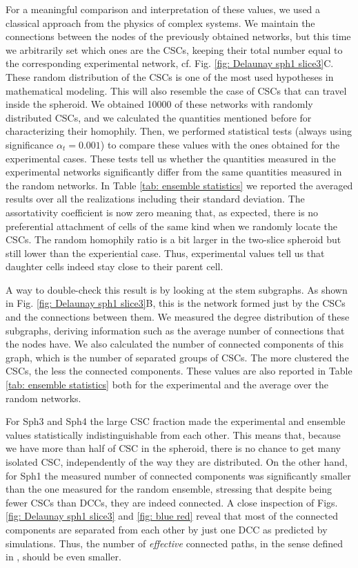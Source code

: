 \documentclass[fleqn,10pt]{wlscirep}
\begin{document}
For a meaningful comparison and interpretation of these values, we used a classical approach from the physics of complex systems. We maintain the connections between the nodes of the previously obtained networks, but this time we arbitrarily set which ones are the CSCs, keeping their total number equal to the corresponding experimental network, cf. Fig. \ref{fig: Delaunay sph1 slice3}C. These random distribution of the CSCs is one of the most used hypotheses in mathematical modeling. This will also resemble the case of CSCs that can travel inside the spheroid. We obtained 10000 of these networks with randomly distributed CSCs, and we calculated the quantities mentioned before for characterizing their homophily. Then, we performed statistical tests (always using significance $\alpha_t=0.001$) to compare these values with the ones obtained for the experimental cases. These tests tell us whether the quantities measured in the experimental networks significantly differ from the same quantities measured in the random networks. In Table \ref{tab: ensemble statistics} we reported the averaged results over all the realizations including their standard deviation. The assortativity coefficient is now zero meaning that, as expected, there is no preferential attachment of cells of the same kind when we randomly locate the CSCs. The random homophily ratio is a bit larger in the two-slice spheroid but still lower than the experiential case. Thus, experimental values tell us that daughter cells indeed stay close to their parent cell. 

A way to double-check this result is by looking at the stem subgraphs. As shown in Fig. \ref{fig: Delaunay sph1 slice3}B, this is the network formed just by the CSCs and the connections between them. We measured the degree distribution of these subgraphs, deriving information such as the average number of connections that the nodes have. We also calculated the number of connected components of this graph, which is the number of separated groups of CSCs. The more clustered the CSCs, the less the connected components. These values are also reported in Table \ref{tab: ensemble statistics} both for the experimental and the average over the random networks.

For \textsf{ Sph3} and \textsf{ Sph4} the large CSC fraction made the experimental and ensemble values statistically indistinguishable from each other. This means that, because we have more than half of CSC in the spheroid, there is no chance to get many isolated CSC, independently of the way they are distributed. 
On the other hand, for \textsf{ Sph1} the measured number of connected components was significantly smaller than the one measured for the random ensemble, stressing that despite being fewer CSCs than DCCs, they are indeed connected. A close inspection of Figs. \ref{fig: Delaunay sph1 slice3} and \ref{fig: blue red} reveal that most of the connected components are separated from each other by just one DCC as predicted by simulations. Thus, the number of \emph{effective} connected paths, in the sense defined in \cite{barberis2021percolation}, should be even smaller.
\end{document}
